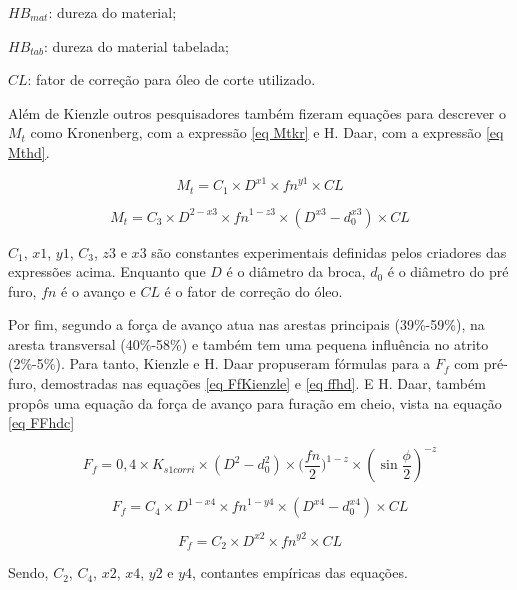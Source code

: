\documentclass[deposito, acronym, symbols]{fei}
\begin{document}
$HB_{mat}$: dureza do material;

$HB_{tab}$: dureza do material tabelada;

$CL$: fator de correção para óleo de corte utilizado.

Além de Kienzle outros pesquisadores também fizeram equações para descrever o $M_t$ como Kronenberg, com a expressão \ref{eq Mtkr} e H. Daar, com a expressão \ref{eq Mthd}.

\begin{equation}
    \label{eq Mtkr}
    M_t=C_1\times{D}^{x1}\times{fn}^{y1}\times{CL}
\end{equation}

\begin{equation}
    \label{eq Mthd}
    M_t=C_3\times{D}^{2-x3}\times{fn}^{1-z3}\times{(D^{x3}-d_0^{x3})}\times{CL}
\end{equation}

$C_1$, $x1$, $y1$, $C_3$, $z3$ e $x3$ são constantes experimentais definidas pelos criadores das expressões acima. Enquanto que $D$ é o diâmetro da broca, $d_0$ é o diâmetro do pré furo, $fn$ é o avanço e $CL$ é o fator de correção do óleo.

Por fim, segundo \textcite{diniz2002tecmat} a força de avanço atua nas arestas principais (39\%-59\%), na aresta transversal (40\%-58\%) e também tem uma pequena influência no atrito (2\%-5\%). Para tanto, Kienzle e H. Daar propuseram fórmulas para a $F_f$ com pré-furo, demostradas nas equações \ref{eq FfKienzle} e \ref{eq ffhd}. E H. Daar, também propôs uma equação da força de avanço para furação em cheio, vista na equação \ref{eq FFhdc}

\begin{equation}
    \label{eq FfKienzle}
    F_{f}=0,4\times{K_{s1corri}}\times{({D^2-d_0^2})}\times{(\frac{fn}{2}})^{1-z}\times({\sin{\frac{\phi}{2}}})^{-z}
\end{equation}

\begin{equation}
    \label{eq ffhd}
    F_f=C_4\times{D}^{1-x4}\times{fn}^{1-y4}\times{(D^{x4}-d_0^{x4})}\times{CL}
\end{equation}


\begin{equation}
    \label{eq FFhdc}
    F_f=C_2\times{D}^{x2}\times{fn}^{y2}\times{CL}
\end{equation}

Sendo, $C_2$, $C_4$, $x2$, $x4$, $y2$ e $y4$, contantes empíricas das equações.
\end{document}
